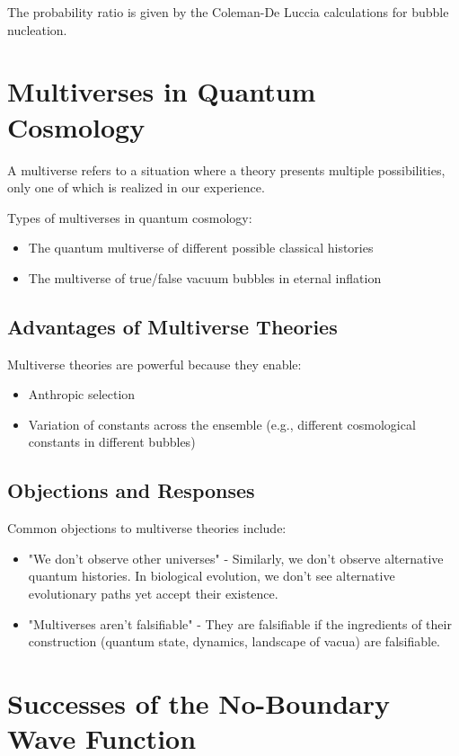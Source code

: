 \documentclass[12pt,a4paper]{article}
\begin{document}
The probability ratio is given by the Coleman-De Luccia calculations for bubble nucleation.

\section{Multiverses in Quantum Cosmology}

A multiverse refers to a situation where a theory presents multiple possibilities, only one of which is realized in our experience.

Types of multiverses in quantum cosmology:
\begin{itemize}
    \item The quantum multiverse of different possible classical histories
    \item The multiverse of true/false vacuum bubbles in eternal inflation
\end{itemize}

\subsection{Advantages of Multiverse Theories}

Multiverse theories are powerful because they enable:
\begin{itemize}
    \item Anthropic selection
    \item Variation of constants across the ensemble (e.g., different cosmological constants in different bubbles)
\end{itemize}

\subsection{Objections and Responses}

Common objections to multiverse theories include:
\begin{itemize}
    \item "We don't observe other universes" - Similarly, we don't observe alternative quantum histories. In biological evolution, we don't see alternative evolutionary paths yet accept their existence.
    \item "Multiverses aren't falsifiable" - They are falsifiable if the ingredients of their construction (quantum state, dynamics, landscape of vacua) are falsifiable.
\end{itemize}

\section{Successes of the No-Boundary Wave Function}
\end{document}
